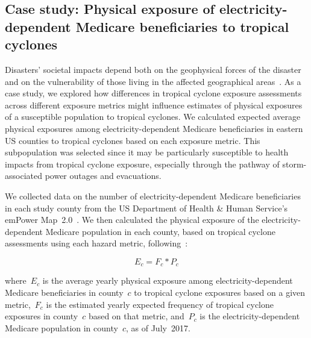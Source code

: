 \subsection*{Case study: Physical exposure of electricity-dependent Medicare
beneficiaries to tropical cyclones}

Disasters' societal impacts depend both on the geophysical forces of the
disaster and on the vulnerability of those living in the affected geographical
areas~\parencite{chakraborty2005population, anderson2003community,
cutter1996vulnerability}. As a case study, we explored how differences in
tropical cyclone exposure assessments across different exposure metrics might
influence estimates of physical exposures of a susceptible population to
tropical cyclones. We calculated expected average physical exposures among
electricity-dependent Medicare beneficiaries in eastern \ac{US} counties to
tropical cyclones based on each exposure metric. This subpopulation was
selected since it may be particularly susceptible to health impacts from
tropical cyclone exposure, especially through the pathway of storm-associated
power outages and evacuations. 

We collected data on the number of electricity-dependent Medicare beneficiaries
in each study county from the \ac{US} Department of Health \& Human Service's
emPower Map~2.0~\parencite{empower}. We then calculated the physical exposure
of the electricity-dependent Medicare population in each county, based on
tropical cyclone assessments using each hazard metric,
following~\parencite{peduzzi2009assessing}:

\begin{equation}
E_c = F_c * P_c
\end{equation}

\noindent where~$E_c$ is the average yearly physical exposure among
electricity-dependent Medicare beneficiaries in county~$c$ to tropical cyclone
exposures based on a given metric,~$F_c$ is the estimated yearly expected
frequency of tropical cyclone exposures in county~$c$ based on that metric,
and~$P_c$ is the electricity-dependent Medicare population in
county~$c$, as of July~2017. 

\begin{comment}
When combined with estimates of vulnerability of a
population to a natural hazard, such measurements of physical exposure can be
used to calculate risk of human losses from the
hazard~\parencite{peduzzi2009assessing}.
\end{comment}


